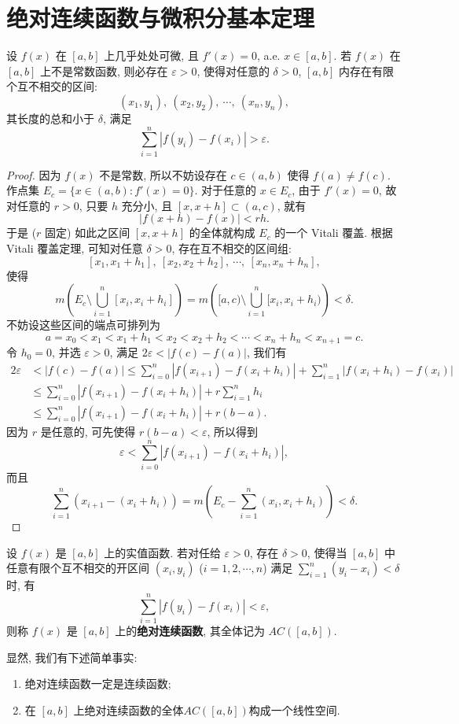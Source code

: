 \documentclass[../../main.tex]{subfiles}%
\begin{document}
\section{绝对连续函数与微积分基本定理}

\begin{lemma}\label{lemma:实变函数--引理5.9}
设 $f(x)$ 在 $[a,b]$ 上几乎处处可微, 且 $f'(x)=0$, a.e. $x\in[a,b]$. 若 $f(x)$ 在 $[a,b]$ 上不是常数函数, 则必存在 $\varepsilon>0$, 使得对任意的 $\delta>0$, $[a,b]$ 内存在有限个互不相交的区间:
\[
(x_1,y_1),\ (x_2,y_2),\ \cdots,\ (x_n,y_n),
\]
其长度的总和小于 $\delta$, 满足
\[
\sum_{i=1}^n |f(y_i)-f(x_i)|>\varepsilon.
\]
\end{lemma}

\begin{proof}

因为 $f(x)$ 不是常数, 所以不妨设存在 $c\in(a,b)$ 使得 $f(a)\neq f(c)$. 作点集 $E_c = \{x\in(a,b): f'(x)=0\}$. 对于任意的 $x\in E_c$, 由于 $f'(x)=0$, 故对任意的 $r>0$, 只要 $h$ 充分小, 且 $[x,x+h]\subset(a,c)$, 就有
\[
|f(x+h)-f(x)| < rh.
\]
于是 ($r$ 固定) 如此之区间 $[x,x+h]$ 的全体就构成 $E_c$ 的一个 Vitali 覆盖. 根据 Vitali 覆盖定理, 可知对任意 $\delta>0$, 存在互不相交的区间组:
\[
[x_1,x_1+h_1],\ [x_2,x_2+h_2],\ \cdots,\ [x_n,x_n+h_n],
\]
使得
\[
m\left(E_c\setminus\bigcup_{i=1}^n [x_i,x_i+h_i]\right) = m\left([a,c)\setminus\bigcup_{i=1}^n [x_i,x_i+h_i)\right) < \delta.
\]
不妨设这些区间的端点可排列为
\[
a = x_0 < x_1 < x_1+h_1 < x_2 < x_2+h_2 < \cdots < x_n+h_n < x_{n+1} = c.
\]
令 $h_0=0$, 并选 $\varepsilon>0$, 满足 $2\varepsilon < |f(c)-f(a)|$, 我们有
\begin{align*}
2\varepsilon &< |f(c)-f(a)| 
\leqslant \sum_{i=0}^n |f(x_{i+1})-f(x_i+h_i)| + \sum_{i=1}^n |f(x_i+h_i)-f(x_i)| \\
&\leqslant \sum_{i=0}^n |f(x_{i+1})-f(x_i+h_i)| + r\sum_{i=1}^n h_i \\
&\leqslant \sum_{i=0}^n |f(x_{i+1})-f(x_i+h_i)| + r(b-a).
\end{align*}
因为 $r$ 是任意的, 可先使得 $r(b-a)<\varepsilon$, 所以得到
\[
\varepsilon < \sum_{i=0}^n |f(x_{i+1})-f(x_i+h_i)|,
\]
而且
\[
\sum_{i=1}^n (x_{i+1}-(x_i+h_i)) = m\left(E_c - \sum_{i=1}^n (x_i,x_i+h_i)\right) < \delta.
\]

\end{proof}

\begin{definition}[绝对连续函数]\label{definecolor:绝对连续函数的定义}
设 $f(x)$ 是 $[a,b]$ 上的实值函数. 若对任给 $\varepsilon>0$, 存在 $\delta>0$, 使得当 $[a,b]$ 中任意有限个互不相交的开区间 $(x_i,y_i)$ ($i=1,2,\cdots,n$) 满足 $\sum_{i=1}^n (y_i-x_i) < \delta$ 时, 有
\[
\sum_{i=1}^n |f(y_i)-f(x_i)| < \varepsilon,
\]
则称 $f(x)$ 是 $[a,b]$ 上的\textbf{绝对连续函数}, 其全体记为 $AC([a,b])$.
\end{definition}
\begin{remark}
显然, 我们有下述简单事实:
\begin{enumerate}[(1)]
\item 绝对连续函数一定是连续函数;

\item 在 $[a,b]$ 上绝对连续函数的全体$AC([a,b])$构成一个线性空间.
\end{enumerate}
\end{remark}
\end{document}
